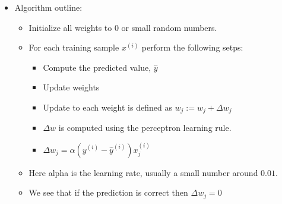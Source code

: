 \documentclass[11pt]{article}
\begin{document}
\begin{itemize}
\item Algorithm outline:
	\begin{itemize}
	\item Initialize all weights to $0$ or small random numbers.
	\item For each training sample $x^{(i)}$ perform the following setps:

		\begin{itemize}
		\item Compute the predicted value, $\hat y$
		\item Update weights
		\item Update to each weight is defined as $w_j := w_j + \Delta w_j$
		\item $\Delta w$ is computed using the perceptron learning rule.
		\item $\Delta w_j = \alpha(y^{(i)} - \hat y^{(i)})x^{(i)}_{j}$
		\end{itemize}
		
		\item Here alpha is the learning rate, usually a small number around $0.01$.
		\item We see that if the prediction is correct then $\Delta w_j = 0$

	\end{itemize}	
\end{itemize}
	
\end{document}
